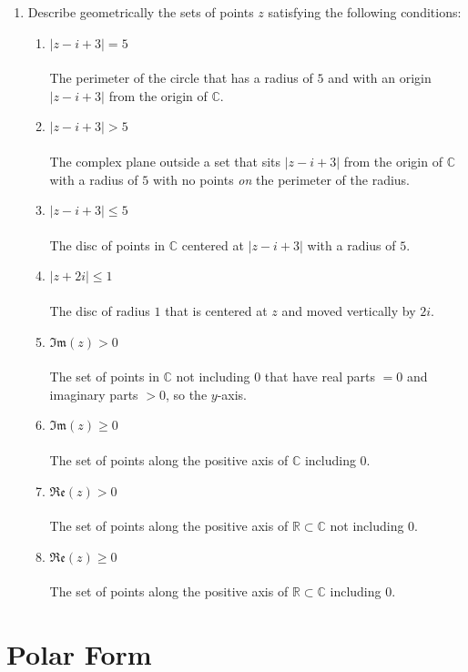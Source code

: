 \begin{enumerate}
	\item Describe geometrically the sets of points $z$ satisfying the following conditions:
	\begin{enumerate}
		\item $|z - i + 3| = 5$ \\
		\\
		The perimeter of the circle that has a radius of $5$ and with an origin $|z - i + 3|$ from the origin of $\mathbb{C}.$
		\item $|z - i + 3| > 5$ \\
		\\
		The complex plane outside a set that sits $|z -i + 3|$ from the origin of $\mathbb{C}$ with a radius of $5$ with no points \textit{on} the perimeter of the radius.
		\item $|z - i + 3| \leq 5$ \\
		\\
		The disc of points in $\mathbb{C}$ centered at $|z - i + 3|$ with a radius of $5.$
		\item $|z + 2i| \leq 1$ \\
		\\
		The disc of radius $1$ that is centered at $z$ and moved vertically by $2i.$
		\item $\mathfrak{Im}(z) > 0$ \\
		\\
		The set of points in $\mathbb{C}$ not including $0$ that have real parts $= 0$ and imaginary parts $>0$, so the $y$-axis.
		\item $\mathfrak{Im}(z) \geq 0$ \\
		\\
		The set of points along the positive axis of $\mathbb{C}$ including $0.$
		\item $\mathfrak{Re}(z) > 0$ \\
		\\
		The set of points along the positive axis of $\mathbb{R} \subset \mathbb{C}$ not including $0.$
		\item $\mathfrak{Re}(z) \geq 0$ \\
		\\
		The set of points along the positive axis of $\mathbb{R} \subset \mathbb{C}$ including $0.$
	\end{enumerate}
\end{enumerate}


\section{Polar Form}
